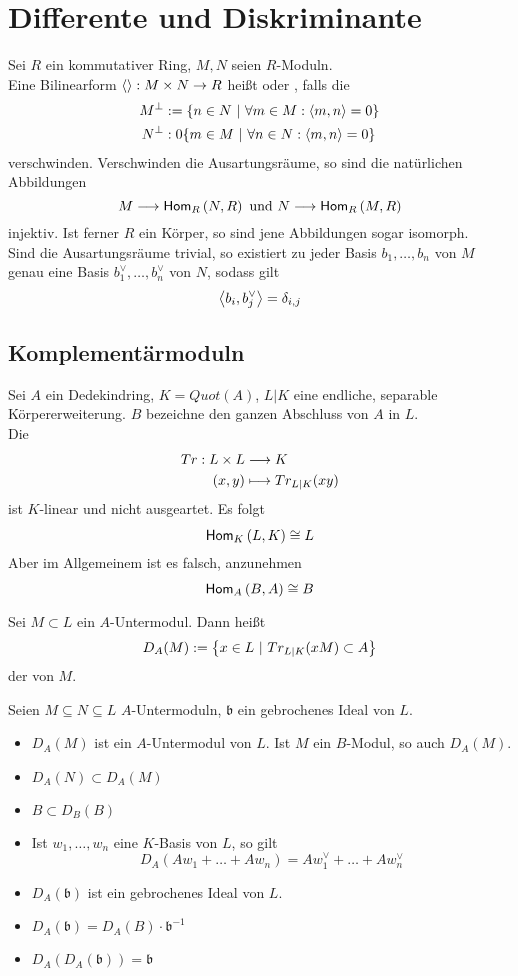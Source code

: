 \documentclass{book}
\renewcommand{\i}{^{-1}}
\renewcommand{\bf}{\mathfrak{b}}
\begin{document}
\tableofcontents

\chapter{Differente und Diskriminante}
Sei $R$ ein kommutativer Ring, $M,N$ seien $R$-Moduln.\\
Eine Bilinearform $\left<\right> : M\times N \overset{}{\rightarrow} R$ heißt  oder , falls die 
\begin{align*}
M^\bot &:= \{n \in N ~|~ \forall m \in M : \left<m,n\right> = 0\}\\
N^\bot &:0 \{m \in M ~|~ \forall n \in N: \left<m,n\right> = 0\}
\end{align*}
verschwinden.
\Bem{}
Verschwinden die Ausartungsräume, so sind die natürlichen Abbildungen
\[ M \overset{}{\longrightarrow} \textsf{Hom}_{R}\left(N, R\right) \text{ und } N \overset{}{\longrightarrow} \textsf{Hom}_{R}\left(M, R\right) \]
injektiv. Ist ferner $R$ ein Körper, so sind jene Abbildungen sogar isomorph.\\
Sind die Ausartungsräume trivial, so existiert zu jeder Basis $b_1,\ldots, b_n$ von $M$ genau eine Basis $b_1^\vee,\ldots, b_n^\vee$ von $N$, sodass gilt
\[ \left<b_i,b_j^\vee\right> = \delta_{i,j} \]

\section{Komplementärmoduln}
\Bem{}
Sei $A$ ein Dedekindring, $K = Quot(A)$, $L|K$ eine endliche, separable Körpererweiterung. $B$ bezeichne den ganzen Abschluss von $A$ in $L$.\\
Die 
\begin{align*}
Tr : L\times L &\overset{}{\longrightarrow} K\\
(x,y) & \longmapsto Tr_{L|K}(xy)
\end{align*}
ist $K$-linear und nicht ausgeartet. Es folgt
\[ \textsf{Hom}_{K}\left(L, K\right) \overset{}{\cong} L \]
Aber im Allgemeinem ist es falsch, anzunehmen
\[ \textsf{Hom}_{A}\left(B, A\right) \overset{}{\cong} B \]

Sei $M\subset L$ ein $A$-Untermodul. Dann heißt
\[ D_A(M) := \set{x\in L}{Tr_{L|K}(xM) \subset A} \]
der  von $M$.

\Satz{}
Seien $M \subseteq N \subseteq L$ $A$-Untermoduln, $\bf$ ein gebrochenes Ideal von $L$.
\begin{itemize}
	\item $D_A(M)$ ist ein $A$-Untermodul von $L$. Ist $M$ ein $B$-Modul, so auch $D_A(M)$.
	\item $D_A(N) \subset D_A(M)$
	\item $B \subset D_B(B)$
	\item Ist $w_1,\ldots,w_n$ eine $K$-Basis von $L$, so gilt
	\[ D_A(Aw_1 + \ldots + Aw_n) = Aw_1^\vee + \ldots + Aw_n^\vee \]
	\item $D_A(\bf)$ ist ein gebrochenes Ideal von $L$.
	\item $D_A(\bf) = D_A(B)\cdot \bf\i$
	\item $D_A(D_A(\bf)) = \bf$
\end{itemize}
\end{document}
